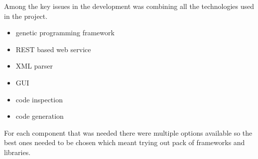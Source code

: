 Among the key issues in the development was combining all the technologies used in the project.
\begin{itemize}
\item genetic programming framework
\item REST based web service
\item XML parser
\item GUI
\item code inspection
\item code generation
\end{itemize}
For each component that was needed there were multiple options available so the best ones needed to be chosen which meant
trying out pack of frameworks and libraries.